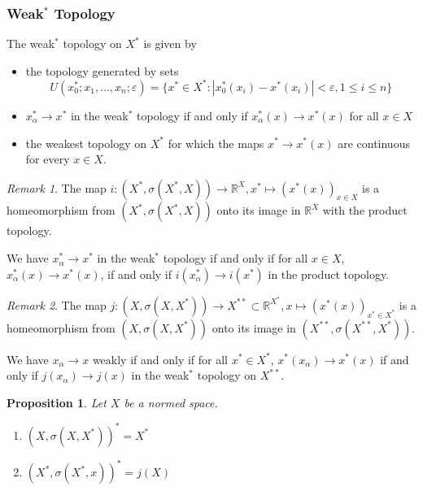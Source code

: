 \documentclass[11pt, reqno]{article}
\theoremstyle{plain}
\newtheorem*{proposition}{Proposition}
\theoremstyle{definition}
\theoremstyle{remark}
\newtheorem*{remark}{Remark}
\renewcommand{\epsilon}{\varepsilon}
\newcommand{\RR}{\mathbb{R}}
\begin{document}
\subsubsection*{Weak$^*$ Topology}

The weak$^*$ topology on $X^*$ is given by 
\begin{itemize}
    \item the topology generated by sets 
    \[
    U(x_0^*; x_1, \dots, x_n; \epsilon) = \{x^* \in X^*: |x_0^*(x_i) - x^*(x_i)| < \epsilon, 1 \leq i \leq n\}
    \]

    \item $x_\alpha^* \rightarrow x^*$ in the weak$^*$ topology if and only if $x_\alpha^*(x) \rightarrow x^*(x)$ for 
    all $x \in X$
    
    \item the weakest topology on $X^*$ for which the maps $x^* \rightarrow x^*(x)$ are continuous for every $x \in X$.
\end{itemize}

\begin{remark}
    The map $i: (X^*, \sigma(X^*, X)) \rightarrow \RR^X, x^* \mapsto {(x^*(x))}_{x \in X}$ is a homeomorphism from $(X^*, \sigma(X^*, X))$ onto its
    image in $\RR^X$ with the product topology.

    We have $x_\alpha^* \rightarrow x^*$ in the weak$^*$ topology if and only if for all $x \in X$, $x_\alpha^*(x) \rightarrow x^*(x)$,
    if and only if $i(x_\alpha^*) \rightarrow i(x^*)$ in the product topology. 
\end{remark}

\begin{remark}
    The map $j: (X, \sigma(X, X^*)) \rightarrow X^{**} \subset \RR^{X^*}, x \mapsto (x^*(x))_{x^* \in X^*}$ is a homeomorphism
    from $(X, \sigma(X, X^*))$ onto its image in $(X^{**}, \sigma(X^{**}, X^*))$. 

    We have $x_\alpha \rightarrow x$ weakly if and only if for all $x^* \in X^*$, $x^*(x_\alpha) \rightarrow x^*(x)$
    if and only if $j(x_\alpha) \rightarrow j(x)$ in the weak$^*$ topology on $X^{**}$. 
\end{remark}

\begin{proposition}
    Let $X$ be a normed space. 
    \begin{enumerate}
        \item $(X, \sigma(X, X^*))^* = X^*$
        \item $(X^*, \sigma(X^*, x))^* = j(X)$
    \end{enumerate}
\end{proposition}
\end{document}
